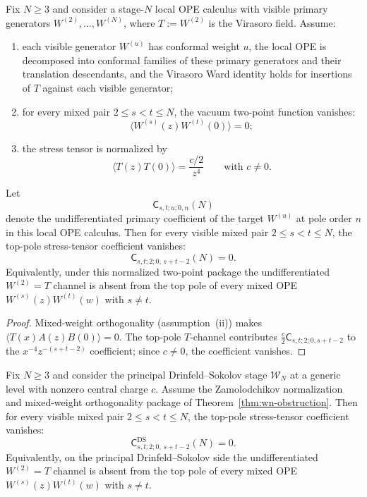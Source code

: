 \begin{proposition}
\label{prop:winfty-formal-mixed-virasoro-zero}
Fix $N \ge 3$ and consider a stage-$N$ local OPE calculus with visible
primary generators $W^{(2)},\dots,W^{(N)}$, where
$T:=W^{(2)}$ is the Virasoro field.  Assume:
\begin{enumerate}[label=\textup{(\roman*)}]
\item each visible generator $W^{(u)}$ has conformal weight $u$, the
  local OPE is decomposed into conformal families of these primary
  generators and their translation descendants, and the Virasoro Ward
  identity holds for insertions of $T$ against each visible generator;
\item for every mixed pair $2 \le s < t \le N$, the vacuum two-point
  function vanishes:
  \[
  \langle W^{(s)}(z)W^{(t)}(0)\rangle=0;
  \]
\item the stress tensor is normalized by
  \[
  \langle T(z)T(0)\rangle=\frac{c/2}{z^4}
  \qquad\text{with } c\neq 0.
  \]
\end{enumerate}
Let
\[
\mathsf{C}_{s,t;u;0,n}(N)
\]
denote the undifferentiated primary coefficient of the target
$W^{(u)}$ at pole order $n$ in this local OPE calculus.  Then for every
visible mixed pair $2 \le s < t \le N$, the top-pole stress-tensor
coefficient vanishes:
\[
\mathsf{C}_{s,t;2;0,\,s+t-2}(N)=0.
\]
Equivalently, under this normalized two-point package the
undifferentiated $W^{(2)}=T$ channel is absent from the top pole of
every mixed OPE $W^{(s)}(z)W^{(t)}(w)$ with $s\ne t$.
\end{proposition}

\begin{proof}
Mixed-weight orthogonality (assumption~\textup{(ii)}) makes $\langle T(x)A(z)B(0)\rangle = 0$.  The top-pole $T$-channel contributes $\frac{c}{2}\mathsf{C}_{s,t;2;0,s+t-2}$ to the $x^{-4}z^{-(s+t-2)}$ coefficient; since $c\neq 0$, the coefficient vanishes.
\end{proof}

\begin{proposition}
\label{prop:winfty-ds-mixed-virasoro-ds-zero}
Fix $N \ge 3$ and consider the principal Drinfeld--Sokolov stage
$\mathcal{W}_N$ at a generic level with nonzero central charge $c$.
Assume the Zamolodchikov normalization and mixed-weight orthogonality
package of Theorem~\ref{thm:wn-obstruction}.  Then for every visible
mixed pair $2 \le s < t \le N$, the top-pole stress-tensor coefficient
vanishes:
\[
\mathsf{C}^{\mathrm{DS}}_{s,t;2;0,\,s+t-2}(N)=0.
\]
Equivalently, on the principal Drinfeld--Sokolov side the
undifferentiated $W^{(2)}=T$ channel is absent from the top pole of
every mixed OPE $W^{(s)}(z)W^{(t)}(w)$ with $s \ne t$.
\end{proposition}

